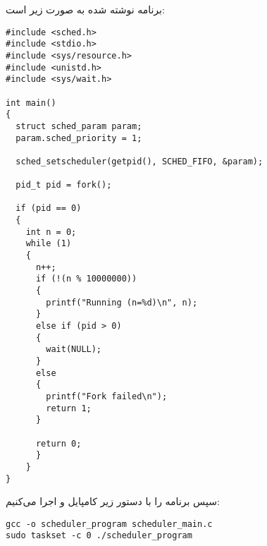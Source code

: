 \begin{qsolve}
	برنامه نوشته شده به صورت زیر است:
	
\begin{latin}
\begin{lstlisting}[caption=code]
#include <sched.h>
#include <stdio.h>
#include <sys/resource.h>
#include <unistd.h>
#include <sys/wait.h>

int main() 
{
  struct sched_param param;
  param.sched_priority = 1;

  sched_setscheduler(getpid(), SCHED_FIFO, &param);

  pid_t pid = fork();

  if (pid == 0) 
  {
	int n = 0;
	while (1) 
	{
	  n++;
	  if (!(n % 10000000)) 
	  {
	    printf("Running (n=%d)\n", n);
	  }
	  else if (pid > 0) 
	  {
	  	wait(NULL);
	  } 
	  else 
	  {
	  	printf("Fork failed\n");
	  	return 1;
	  }
	  
	  return 0;
	  }
	}
} 
\end{lstlisting}
\end{latin}

سپس برنامه را با دستور زیر کامپایل و اجرا می‌کنیم:
\begin{latin}
\texttt{gcc -o scheduler\_program scheduler\_main.c}\\
\texttt{sudo taskset -c 0 ./scheduler\_program}
\end{latin}




\end{qsolve}








